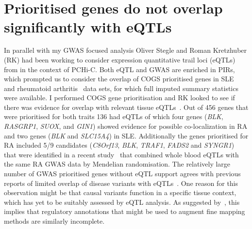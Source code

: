 \documentclass[a4paper,11pt]{report}
\begin{document}




\section{Prioritised genes do not overlap significantly with eQTLs}
In parallel with my GWAS focused analysis Oliver Stegle and Roman Kretzhuber (RK) had been working to consider expression quantitative trail loci (eQTLs) from \citet{FairfaxMakinoRadhakrishnanEtAl2012} in the context of PCHi-C. Both eQTL and GWAS are enriched in PIRs, which prompted us to consider the overlap of COGS prioritised genes in SLE~\citep{Bentham2015-di} and rheumatoid arthritis~\citep{Okada2014-um} data sets, for which full imputed summary statistics were available. I performed COGS gene prioritisation and RK looked to see if there was evidence for overlap with relevant tissue eQTLs~\citep{FairfaxMakinoRadhakrishnanEtAl2012}.  Out of 456 genes that were prioritised for both traits 136 had eQTLs  of which four genes (\textit{BLK}, \textit{RASGRP1}, \textit{SUOX}, and \textit{GIN1}) showed evidence for possible co-localization in RA and two genes (\textit{BLK} and \textit{SLC15A4}) in SLE. Additionally the genes prioritised for RA included 5/9 candidates (\textit{C8Orf13}, \textit{BLK}, \textit{TRAF1}, \textit{FADS2} and \textit{SYNGR1}) that were identified in a recent study~\citep{ZhuZhangHuEtAl2016} that combined whole blood eQTLs with the same RA GWAS data by Mendelian randomisation. The relatively large number of GWAS prioritised genes without eQTL support  agrees with previous reports of limited overlap of disease variants with eQTLs~\citep{Guo2015-ka,HuangChenEsparzaEtAl2015}. One reason for this observation might be that  causal variants function in a specific tissue context, which has yet to be suitably assessed by eQTL analysis. As suggested by~\citet{Huang2015-ug}, this implies that regulatory annotations that might be used to augment fine mapping methods are similarly incomplete. 
\end{document}
